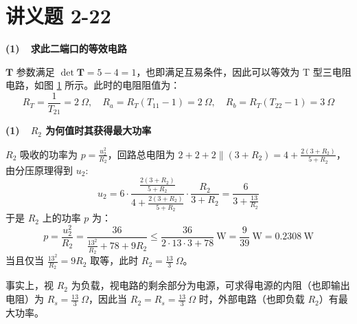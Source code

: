 \documentclass[UTF8]{report}
\theoremstyle{MyLineTheoremStyle} %
\theoremstyle{MyBlockTheoremStyle} %
\theoremstyle{MySubsubsectionStyle} %
\begin{document}
\section{讲义题 2-22}

\noindent \textbf{(1)\ \ 求此二端口的等效电路}

$\boldsymbol{T}$ 参数满足 $\det \boldsymbol{T} = 5 - 4 = 1$，也即满足互易条件，因此可以等效为 T 型三电阻电路，如图 \ref{} 所示。此时的电阻阻值为：
\begin{equation}
R_T = \frac{1}{T_{21}} = 2 \ \Omega,\quad R_a = R_T(T_{11} - 1) = 2\ \Omega,\quad R_b = R_T(T_{22} - 1) = 3\ \Omega
\end{equation}

\noindent \textbf{(1)\ \ $R_2$ 为何值时其获得最大功率}

$R_2$ 吸收的功率为 $p = \frac{u_2^2}{R_2}$，回路总电阻为 $2 + 2 + 2 \parallel (3 + R_2) = 4 + \frac{2(3+R_2)}{5+R_2}$，由分压原理得到 $u_2$:
\begin{equation}
u_2 = 6\cdot \frac{\frac{2(3+R_2)}{5+R_2}}{4 + \frac{2(3+R_2)}{5+R_2}} \cdot \frac{R_2}{ 3 + R_2} = \frac{6}{3+\frac{13}{R_2}}
\end{equation}
于是 $R_2$ 上的功率 $p$ 为：
\begin{equation}
p = \frac{u_2^2}{R_2} = \frac{36}{\frac{13^2}{R_2} + 78 + 9R_2} \leqslant \frac{36}{2\cdot 13 \cdot 3 + 78} \ \mathrm{W} = \frac{9}{39}\ \mathrm{W} = 0.2308 \ \mathrm{W}
\end{equation}
当且仅当 $\frac{13^2}{R_2} = 9R_2$ 取等，此时 $R_2 = \frac{13}{3}\ \Omega$。

事实上，视 $R_2$ 为负载，视电路的剩余部分为电源，可求得电源的内阻（也即输出电阻）为 $R_s = \frac{13}{3}\ \Omega$，因此当 $R_2 = R_s =  \frac{13}{3}\ \Omega$ 时，外部电路（也即负载 $R_2$）有最大功率。 
\end{document}
